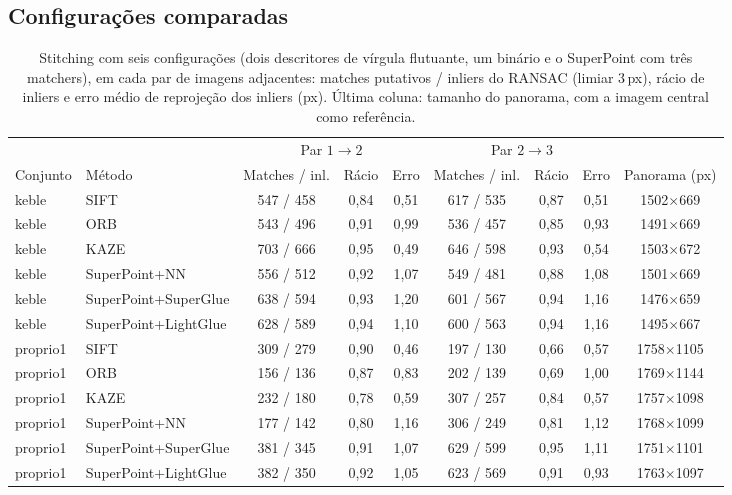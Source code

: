 \documentclass[11pt,a4paper]{article}
\newcommand{\px}{\,px}
\begin{document}
\subsection{Configurações comparadas}
\label{sec:configuracoes}
\begin{table}[H]
\centering\small
\caption{Stitching com seis configurações (dois descritores de vírgula flutuante, um binário e o
SuperPoint com três matchers), em cada par de imagens adjacentes: matches putativos / inliers do RANSAC (limiar 3\px), rácio
de inliers e erro médio de reprojeção dos inliers (px). Última coluna: tamanho do panorama, com a imagem
central como referência.}
\label{tab:stitching}
\setlength{\tabcolsep}{3.5pt}
\begin{tabular}{llccccccc}
\toprule
 & & \multicolumn{3}{c}{Par $1\to2$} & \multicolumn{3}{c}{Par $2\to3$} & \\
\cmidrule(lr){3-5}\cmidrule(lr){6-8}
Conjunto & Método & Matches / inl. & Rácio & Erro & Matches / inl. & Rácio & Erro & Panorama (px) \\
\midrule
keble & SIFT & 547 / 458 & 0,84 & 0,51 & 617 / 535 & 0,87 & 0,51 & 1502$\times$669 \\
keble & ORB & 543 / 496 & 0,91 & 0,99 & 536 / 457 & 0,85 & 0,93 & 1491$\times$669 \\
keble & KAZE & 703 / 666 & 0,95 & 0,49 & 646 / 598 & 0,93 & 0,54 & 1503$\times$672 \\
keble & SuperPoint+NN & 556 / 512 & 0,92 & 1,07 & 549 / 481 & 0,88 & 1,08 & 1501$\times$669 \\
keble & SuperPoint+SuperGlue & 638 / 594 & 0,93 & 1,20 & 601 / 567 & 0,94 & 1,16 & 1476$\times$659 \\
keble & SuperPoint+LightGlue & 628 / 589 & 0,94 & 1,10 & 600 / 563 & 0,94 & 1,16 & 1495$\times$667 \\
\midrule
proprio1 & SIFT & 309 / 279 & 0,90 & 0,46 & 197 / 130 & 0,66 & 0,57 & 1758$\times$1105 \\
proprio1 & ORB & 156 / 136 & 0,87 & 0,83 & 202 / 139 & 0,69 & 1,00 & 1769$\times$1144 \\
proprio1 & KAZE & 232 / 180 & 0,78 & 0,59 & 307 / 257 & 0,84 & 0,57 & 1757$\times$1098 \\
proprio1 & SuperPoint+NN & 177 / 142 & 0,80 & 1,16 & 306 / 249 & 0,81 & 1,12 & 1768$\times$1099 \\
proprio1 & SuperPoint+SuperGlue & 381 / 345 & 0,91 & 1,07 & 629 / 599 & 0,95 & 1,11 & 1751$\times$1101 \\
proprio1 & SuperPoint+LightGlue & 382 / 350 & 0,92 & 1,05 & 623 / 569 & 0,91 & 0,93 & 1763$\times$1097 \\

\end{tabular}
\end{table}
\end{document}
